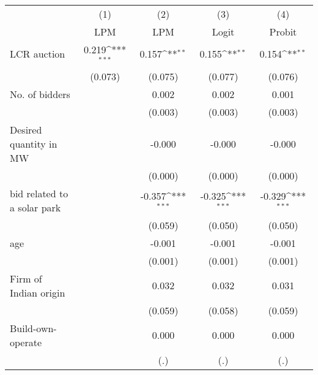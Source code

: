 {
\def\sym#1{\ifmmode^{#1}\else\(^{#1}\)\fi}
\begin{tabular}{l*{4}{c}}
\hline\hline
                    &\multicolumn{1}{c}{(1)}&\multicolumn{1}{c}{(2)}&\multicolumn{1}{c}{(3)}&\multicolumn{1}{c}{(4)}\\
                    &\multicolumn{1}{c}{LPM}&\multicolumn{1}{c}{LPM}&\multicolumn{1}{c}{Logit}&\multicolumn{1}{c}{Probit}\\
\hline
LCR auction         &       0.219\sym{***}&       0.157\sym{**} &       0.155\sym{**} &       0.154\sym{**} \\
                    &     (0.073)         &     (0.075)         &     (0.077)         &     (0.076)         \\
[1em]
No. of bidders      &                     &       0.002         &       0.002         &       0.001         \\
                    &                     &     (0.003)         &     (0.003)         &     (0.003)         \\
[1em]
Desired quantity in MW&                     &      -0.000         &      -0.000         &      -0.000         \\
                    &                     &     (0.000)         &     (0.000)         &     (0.000)         \\
[1em]
bid related to a solar park&                     &      -0.357\sym{***}&      -0.325\sym{***}&      -0.329\sym{***}\\
                    &                     &     (0.059)         &     (0.050)         &     (0.050)         \\
[1em]
age                 &                     &      -0.001         &      -0.001         &      -0.001         \\
                    &                     &     (0.001)         &     (0.001)         &     (0.001)         \\
[1em]
Firm of Indian origin&                     &       0.032         &       0.032         &       0.031         \\
                    &                     &     (0.059)         &     (0.058)         &     (0.059)         \\
[1em]
Build-own-operate   &                     &       0.000         &       0.000         &       0.000         \\
                    &                     &         (.)         &         (.)         &         (.)         \\

\end{tabular}}
